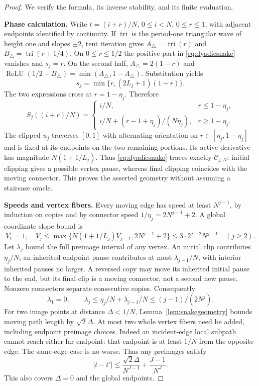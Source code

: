 \documentclass[11pt,letterpaper]{article}
\theoremstyle{definition}\newtheorem{definition}[theorem]{Definition}
\theoremstyle{remark}\newtheorem{remark}[theorem]{Remark}
\begin{document}
\begin{proof}
We verify the formula, its inverse stability, and its finite evaluation.

\smallskip\noindent\textbf{Phase calculation.}
Write $t=(i+r)/N$, $0\le i<N$, $0\le r\le1$, with adjacent endpoints identified by continuity. If $\operatorname{tri}$ is the period-one triangular wave of height one and slopes $\pm2$, tent iteration gives
$A_\triangle=\operatorname{tri}(r)$ and $B_\triangle=\operatorname{tri}(r+1/4)$. On $0\le r\le1/2$ the positive part in \eqref{eq:dyadicsnake} vanishes and $s_j=r$. On the second half, $A_\triangle=2(1-r)$ and
$\operatorname{ReLU}(1/2-B_\triangle)=\min(A_\triangle,1-A_\triangle)$.
Substitution yields
\[
 s_j=\min\{r,(2L_j+1)(1-r)\}.
\]
The two expressions cross at $r=1-\eta_j$. Therefore
\begin{equation}\label{eq:stairphase}
 S_j((i+r)/N)=
 \begin{cases}
 i/N,&r\le1-\eta_j,\\
 i/N+(r-1+\eta_j)/(N\eta_j),&r\ge1-\eta_j.
 \end{cases}
\end{equation}
The clipped $u_j$ traverses $[0,1]$ with alternating orientation on $r\in[\eta_j,1-\eta_j]$ and is fixed at its endpoints on the two remaining portions. Its active derivative has magnitude $N(1+1/L_j)$. Thus \eqref{eq:dyadicsnake} traces exactly $\mathcal C_{j,N}$: initial clipping gives a possible vertex pause, whereas final clipping coincides with the moving connector. This proves the asserted geometry without assuming a staircase oracle.

\smallskip\noindent\textbf{Speeds and vertex fibers.}
Every moving edge has speed at least $N^{j-1}$, by induction on copies and by connector speed $1/\eta_j=2N^{j-1}+2$. A global coordinate slope bound is
\[
 V_1=1,\quad
 V_j\le\max\{N(1+1/L_j)V_{j-1},2N^{j-1}+2\}
 \le3\cdot2^{j-2}N^{j-1}\quad(j\ge2).
\]
Let $\lambda_j$ bound the full preimage interval of any vertex. An initial clip contributes $\eta_j/N$; an inherited endpoint pause contributes at most $\lambda_{j-1}/N$, with interior inherited pauses no larger. A reversed copy may move its inherited initial pause to the end, but its final clip is a moving connector, not a second new pause. Nonzero connectors separate consecutive copies. Consequently
\[
 \lambda_1=0,\qquad
 \lambda_j\le\eta_j/N+\lambda_{j-1}/N
             \le(j-1)/(2N^j).
\]
For two image points at distance $\Delta<1/N$, Lemma~\ref{lem:snakegeometry} bounds moving path length by $\sqrt2\Delta$. At most two whole vertex fibers need be added, including endpoint preimage choices. Indeed an incident-edge local subpath cannot reach either far endpoint: that endpoint is at least $1/N$ from the opposite edge. The same-edge case is no worse. Thus any preimages satisfy
\begin{equation}\label{eq:plateauinverse}
 |t-t'|\le\frac{\sqrt2\Delta}{N^{J-1}}+\frac{J-1}{N^J}.
\end{equation}
This also covers $\Delta=0$ and the global endpoints.


\end{proof}
\end{document}
